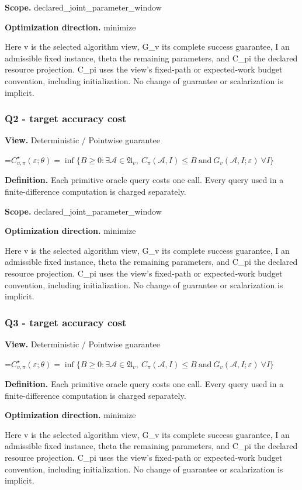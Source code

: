 \documentclass[10pt,a4paper]{article}
\newcommand{\AtlasMath}[1]{\par\begingroup\centering\setbox0=\hbox{$\displaystyle #1$}\ifdim\wd0>1.4\linewidth\typeout{ATLAS WIDE FORMULA: \the\wd0}\fi\ifdim\wd0>\linewidth\resizebox{\linewidth}{!}{\box0}\else\box0\fi\par\endgroup}
\begin{document}
\textbf{Scope.} declared\_joint\_parameter\_window

\textbf{Optimization direction.} minimize

Here v is the selected algorithm view, G\_v its complete success guarantee, I an admissible fixed instance, theta the remaining parameters, and C\_pi the declared resource projection. C\_pi uses the view's fixed-path or expected-work budget convention, including initialization. No change of guarantee or scalarization is implicit.

\subsubsection{Q2 - target accuracy cost}
\textbf{View.} Deterministic / Pointwise guarantee

\AtlasMath{C^\star_{v,\pi}(\varepsilon;\theta)=\inf\{B\ge0:\exists\mathcal A\in\mathfrak A_v,\ C_\pi(\mathcal A,I)\le B\ \text{and}\ G_v(\mathcal A,I;\varepsilon)\ \forall I\}}
\textbf{Definition.} Each primitive oracle query costs one call. Every query used in a finite-difference computation is charged separately.

\textbf{Scope.} declared\_joint\_parameter\_window

\textbf{Optimization direction.} minimize

Here v is the selected algorithm view, G\_v its complete success guarantee, I an admissible fixed instance, theta the remaining parameters, and C\_pi the declared resource projection. C\_pi uses the view's fixed-path or expected-work budget convention, including initialization. No change of guarantee or scalarization is implicit.

\subsubsection{Q3 - target accuracy cost}
\textbf{View.} Deterministic / Pointwise guarantee

\AtlasMath{C^\star_{v,\pi}(\varepsilon;\theta)=\inf\{B\ge0:\exists\mathcal A\in\mathfrak A_v,\ C_\pi(\mathcal A,I)\le B\ \text{and}\ G_v(\mathcal A,I;\varepsilon)\ \forall I\}}
\textbf{Definition.} Each primitive oracle query costs one call. Every query used in a finite-difference computation is charged separately.

\textbf{Optimization direction.} minimize

Here v is the selected algorithm view, G\_v its complete success guarantee, I an admissible fixed instance, theta the remaining parameters, and C\_pi the declared resource projection. C\_pi uses the view's fixed-path or expected-work budget convention, including initialization. No change of guarantee or scalarization is implicit.
\end{document}
